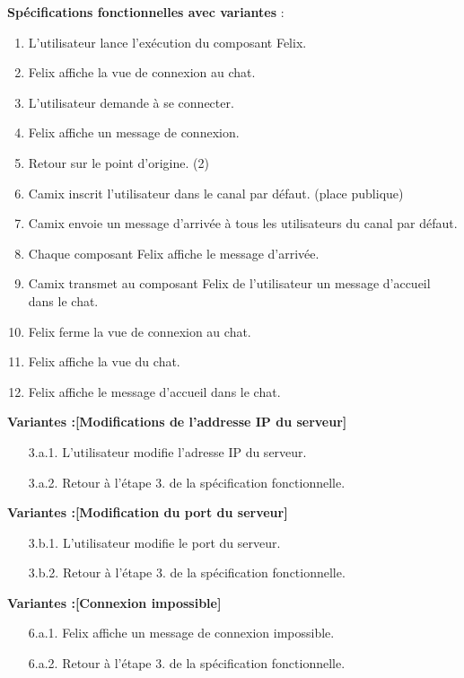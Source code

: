 \medskip
\textbf{Spécifications fonctionnelles avec variantes} :
\begin{enumerate}
\item L'utilisateur lance l'exécution du composant Felix.
\item Felix affiche la vue de connexion au chat.
\item L'utilisateur demande à se connecter.
\item Felix affiche un message de connexion.
\item Retour sur le point d'origine. (2)
    \item Camix inscrit l'utilisateur dans le canal par défaut. (place publique)
    \item Camix envoie un message d'arrivée à tous les utilisateurs du canal par défaut.
    \item Chaque composant Felix affiche le message d'arrivée.
    \item Camix transmet au composant Felix de l'utilisateur un message d'accueil dans le chat.
    \item Felix ferme la vue de connexion au chat.
    \item Felix affiche la vue du chat.
    \item Felix affiche le message d'accueil dans le chat.
\end{enumerate}

\textbf{Variantes :[Modifications de l'addresse IP du serveur]}
\begin{enumerate}
    \item[3.a.1.] L'utilisateur modifie l'adresse IP du serveur.
    \item[3.a.2.] Retour à l'étape 3. de la spécification fonctionnelle.
\end{enumerate}

\textbf{Variantes :[Modification du port du serveur]}
\begin{enumerate}
    \item[3.b.1.] L'utilisateur modifie le port du serveur.
    \item[3.b.2.] Retour à l'étape 3. de la spécification fonctionnelle.
\end{enumerate}

\textbf{Variantes :[Connexion impossible]}
\begin{enumerate}
    \item[6.a.1.] Felix affiche un message de connexion impossible.
    \item[6.a.2.] Retour à l'étape 3. de la spécification fonctionnelle.
\end{enumerate}



